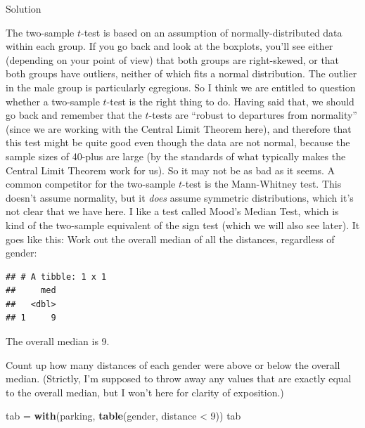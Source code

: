 \documentclass[]{tufte-book}
\newenvironment{Shaded}{}{}
\newcommand{\DataTypeTok}[1]{\textcolor[rgb]{0.56,0.13,0.00}{#1}}
\newcommand{\DecValTok}[1]{\textcolor[rgb]{0.25,0.63,0.44}{#1}}
\newcommand{\KeywordTok}[1]{\textcolor[rgb]{0.00,0.44,0.13}{\textbf{#1}}}
\newcommand{\NormalTok}[1]{#1}
\newcommand{\OperatorTok}[1]{\textcolor[rgb]{0.40,0.40,0.40}{#1}}
\newcommand{\StringTok}[1]{\textcolor[rgb]{0.25,0.44,0.63}{#1}}
\theoremstyle{definition}
\theoremstyle{definition}
\theoremstyle{definition}
\theoremstyle{remark}
\begin{document}
Solution

The two-sample \(t\)-test is based on an assumption of
normally-distributed data within each group. If you go back and look at
the boxplots, you'll see either (depending on your point of view) that
both groups are right-skewed, or that both groups have outliers, neither
of which fits a normal distribution. The outlier in the male group is
particularly egregious.
So I think we are entitled to question whether a two-sample \(t\)-test
is the right thing to do. Having said that, we should go back and
remember that the \(t\)-tests are ``robust to departures from
normality'' (since we are working with the Central Limit Theorem here),
and therefore that this test might be quite good even though the data
are not normal, because the sample sizes of 40-plus are large (by the
standards of what typically makes the Central Limit Theorem work for
us). So it may not be as bad as it seems. A common competitor for the
two-sample \(t\)-test is the Mann-Whitney test. This doesn't assume
normality, but it \emph{does} assume symmetric distributions, which it's
not clear that we have here. I like a test called Mood's Median Test,
which is kind of the two-sample equivalent of the sign test (which we
will also see later). It goes like this: Work out the overall median of
all the distances, regardless of gender:

\begin{Shaded}
\end{Shaded}

\begin{verbatim}
## # A tibble: 1 x 1
##     med
##   <dbl>
## 1     9
\end{verbatim}

The overall median is 9.

Count up how many distances of each gender were above or below the
overall median. (Strictly, I'm supposed to throw away any values that
are exactly equal to the overall median, but I won't here for clarity of
exposition.)

\begin{Shaded}
\begin{Highlighting}[]
\NormalTok{tab =}\StringTok{ }\KeywordTok{with}\NormalTok{(parking, }\KeywordTok{table}\NormalTok{(gender, distance }\OperatorTok{<}\StringTok{ }\DecValTok{9}\NormalTok{))}
\NormalTok{tab}
\end{Highlighting}
\end{Shaded}
\end{document}
